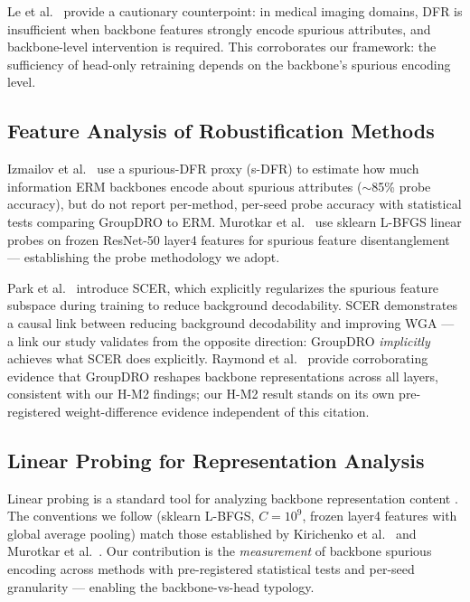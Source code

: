 Le et al.\ \cite{le2023last} provide a cautionary counterpoint: in medical imaging domains, DFR is insufficient when backbone features strongly encode spurious attributes, and backbone-level intervention is required. This corroborates our framework: the sufficiency of head-only retraining depends on the backbone's spurious encoding level.

\subsection{Feature Analysis of Robustification Methods}

Izmailov et al.\ \cite{izmailov2022feature} use a spurious-DFR proxy (s-DFR) to estimate how much information ERM backbones encode about spurious attributes ($\sim$85\% probe accuracy), but do not report per-method, per-seed probe accuracy with statistical tests comparing GroupDRO to ERM. Murotkar et al.\ \cite{murotkar2024identifying} use sklearn L-BFGS linear probes on frozen ResNet-50 layer4 features for spurious feature disentanglement --- establishing the probe methodology we adopt.

Park et al.\ \cite{park2025spurious} introduce SCER, which explicitly regularizes the spurious feature subspace during training to reduce background decodability. SCER demonstrates a causal link between reducing background decodability and improving WGA --- a link our study validates from the opposite direction: GroupDRO \emph{implicitly} achieves what SCER does explicitly. Raymond et al.\ \cite{raymond2026groupdro} provide corroborating evidence that GroupDRO reshapes backbone representations across all layers, consistent with our H-M2 findings; our H-M2 result stands on its own pre-registered weight-difference evidence independent of this citation.

\subsection{Linear Probing for Representation Analysis}

Linear probing is a standard tool for analyzing backbone representation content \cite{alain2016understanding}. The conventions we follow (sklearn L-BFGS, $C=10^9$, frozen layer4 features with global average pooling) match those established by Kirichenko et al.\ \cite{kirichenko2022last} and Murotkar et al.\ \cite{murotkar2024identifying}. Our contribution is the \emph{measurement} of backbone spurious encoding across methods with pre-registered statistical tests and per-seed granularity --- enabling the backbone-vs-head typology.
